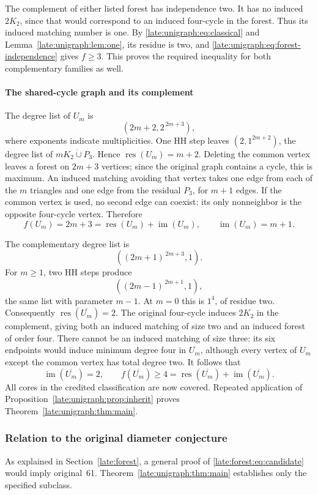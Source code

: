 \documentclass[11pt,a4paper]{article}
\theoremstyle{definition}\newtheorem{definition}[theorem]{Definition}
\theoremstyle{remark}\newtheorem{remark}[theorem]{Remark}
\newcommand{\res}{\operatorname{res}}
\newcommand{\im}{\operatorname{im}}
\begin{document}
The complement of either listed forest has independence two. It has no
induced $2K_2$, since that would correspond to an induced four-cycle in
the forest. Thus its induced matching number is one. By
\eqref{late:unigraph:eq:classical} and Lemma~\ref{late:unigraph:lem:one}, its residue is two, and
\eqref{late:unigraph:eq:forest-independence} gives $f\ge3$. This proves the required
inequality for both complementary families as well.

\paragraph{The shared-cycle graph and its complement}

The degree list of $U_m$ is
\[
(2m+2,2^{\,2m+3}),
\]
where exponents indicate multiplicities. One HH step leaves
$(2,1^{2m+2})$, the degree list of $mK_2\mathbin{\dot\cup} P_3$. Hence
$\res(U_m)=m+2$. Deleting the common vertex leaves a forest on $2m+3$
vertices; since the original graph contains a cycle, this is maximum.
An induced matching avoiding that vertex takes one edge from each of the
$m$ triangles and one edge from the residual $P_3$, for $m+1$ edges.
If the common vertex is used, no second edge can coexist: its only
nonneighbor is the opposite four-cycle vertex. Therefore
\[
f(U_m)=2m+3=\res(U_m)+\im(U_m),\qquad \im(U_m)=m+1.
\]

The complementary degree list is
\[
((2m+1)^{\,2m+3},1).
\]
For $m\ge1$, two HH steps produce
\[
((2m-1)^{\,2m+1},1),
\]
the same list with parameter $m-1$. At $m=0$ this is $1^4$, of residue
two. Consequently $\res(\overline{U_m})=2$.
The original four-cycle induces $2K_2$ in the complement, giving both
an induced matching of size two and an induced forest of order four.
There cannot be an induced matching of size three: its six endpoints
would induce minimum degree four in $U_m$, although every vertex of
$U_m$ except the common vertex has total degree two. It follows that
\[
\im(\overline{U_m})=2,\qquad
f(\overline{U_m})\ge4=\res(\overline{U_m})+\im(\overline{U_m}).
\]
All cores in the credited classification are now covered. Repeated
application of Proposition~\ref{late:unigraph:prop:inherit} proves
Theorem~\ref{late:unigraph:thm:main}.

\subsubsection{Relation to the original diameter conjecture}

As explained in Section~\ref{late:forest}, a general proof of
\eqref{late:forest:eq:candidate} would imply original~61.
Theorem~\ref{late:unigraph:thm:main} establishes only the specified subclass.
\end{document}

